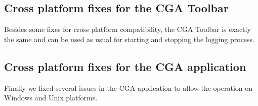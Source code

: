 \subsection{Cross platform fixes for the CGA Toolbar} Besides some fixes for cross platform compatibility, the CGA Toolbar is exactly the same and can be used as usual for starting and stopping the logging process.

\subsection{Cross platform fixes for the CGA application} Finally we fixed several issues in the CGA application to allow the operation on Windows and Unix platforms.